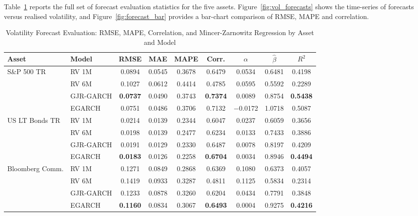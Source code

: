 \documentclass[12pt, a4paper]{article}
\begin{document}
Table~\ref{tab:mz} reports the full set of forecast evaluation statistics for the five
assets. Figure~\ref{fig:vol_forecasts} shows the time-series of forecasts versus realised
volatility, and Figure~\ref{fig:forecast_bar} provides a bar-chart comparison of RMSE,
MAPE and correlation.

\begin{table}[H]
  \centering
  \caption{Volatility Forecast Evaluation: RMSE, MAPE, Correlation, and Mincer-Zarnowitz
           Regression by Asset and Model}
  \label{tab:mz}
  \footnotesize
  \begin{tabular}{llccccccc}
    \toprule
    \textbf{Asset} & \textbf{Model}
      & \textbf{RMSE} & \textbf{MAE} & \textbf{MAPE}
      & \textbf{Corr.} & {$\hat{\alpha}$} & {$\hat{\beta}$} & {$R^2$} \\
    \midrule
    \multirow{4}{*}{S\&P 500 TR}
      & RV 1M        & 0.0894 & 0.0545 & 0.3678 & 0.6479 &  0.0534 & 0.6481 & 0.4198 \\
      & RV 6M        & 0.1027 & 0.0612 & 0.4414 & 0.4785 &  0.0595 & 0.5592 & 0.2289 \\
      & GJR-GARCH    & \bfseries 0.0737 & 0.0490 & 0.3743 & \bfseries 0.7374 &  0.0089 & 0.8754 & \bfseries 0.5438 \\
      & EGARCH       & 0.0751 & 0.0486 & 0.3706 & 0.7132 & {$-$0.0172} & 1.0718 & 0.5087 \\
    \midrule
    \multirow{4}{*}{US LT Bonds TR}
      & RV 1M        & 0.0214 & 0.0139 & 0.2344 & 0.6047 & 0.0237 & 0.6059 & 0.3656 \\
      & RV 6M        & 0.0198 & 0.0139 & 0.2477 & 0.6234 & 0.0133 & 0.7433 & 0.3886 \\
      & GJR-GARCH    & 0.0191 & 0.0129 & 0.2330 & 0.6487 & 0.0078 & 0.8197 & 0.4209 \\
      & EGARCH       & \bfseries 0.0183 & 0.0126 & 0.2258 & \bfseries 0.6704 & 0.0034 & 0.8946 & \bfseries 0.4494 \\
    \midrule
    \multirow{4}{*}{Bloomberg Comm.}
      & RV 1M        & 0.1271 & 0.0849 & 0.2868 & 0.6369 & 0.1080 & 0.6373 & 0.4057 \\
      & RV 6M        & 0.1419 & 0.0933 & 0.3287 & 0.4811 & 0.1125 & 0.5834 & 0.2314 \\
      & GJR-GARCH    & 0.1233 & 0.0878 & 0.3260 & 0.6204 & 0.0434 & 0.7791 & 0.3848 \\
      & EGARCH       & \bfseries 0.1160 & 0.0834 & 0.3067 & \bfseries 0.6493 & 0.0004 & 0.9275 & \bfseries 0.4216 \\

\end{tabular}
\end{table}
\end{document}

